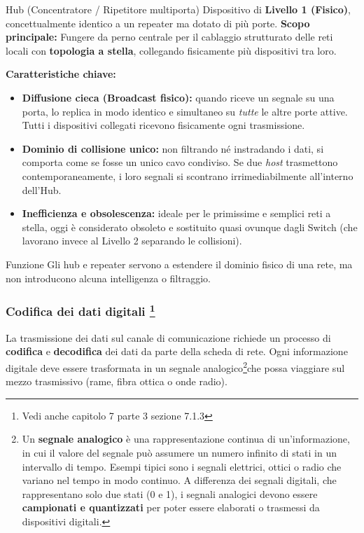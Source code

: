 \documentclass[a4paper,12pt]{report}
\begin{document}
\begin{defbox}{Hub (Concentratore / Ripetitore multiporta)}
Dispositivo di \textbf{Livello 1 (Fisico)}, concettualmente identico a un repeater ma dotato di più porte.  
\textbf{Scopo principale:} Fungere da perno centrale per il cablaggio strutturato delle reti locali con \textbf{topologia a stella}, collegando fisicamente più dispositivi tra loro.

\textbf{Caratteristiche chiave:}
\begin{itemize}
    \item \textbf{Diffusione cieca (Broadcast fisico):} quando riceve un segnale su una porta, lo replica in modo identico e simultaneo su \textit{tutte} le altre porte attive. Tutti i dispositivi collegati ricevono fisicamente ogni trasmissione.
    \item \textbf{Dominio di collisione unico:} non filtrando né instradando i dati, si comporta come se fosse un unico cavo condiviso. Se due \textit{host} trasmettono contemporaneamente, i loro segnali si scontrano irrimediabilmente all'interno dell'Hub.
    \item \textbf{Inefficienza e obsolescenza:} ideale per le primissime e semplici reti a stella, oggi è considerato obsoleto e sostituito quasi ovunque dagli Switch (che lavorano invece al Livello 2 separando le collisioni).
\end{itemize}
\end{defbox}

\begin{notebox}{Funzione}
Gli hub e repeater servono a estendere il dominio fisico di una rete, ma non introducono alcuna intelligenza o filtraggio.
\end{notebox}

\vspace{1cm}

\subsubsection*{Codifica dei dati digitali \footnote{Vedi anche capitolo 7 parte 3 sezione 7.1.3}}

La trasmissione dei dati sul canale di comunicazione richiede un processo di \textbf{codifica} e \textbf{decodifica} dei dati da parte della scheda di rete.  
Ogni informazione digitale deve essere trasformata in un segnale analogico\footnote{%
Un \textbf{segnale analogico} è una rappresentazione continua di un’informazione, 
in cui il valore del segnale può assumere un numero infinito di stati in un intervallo di tempo. 
Esempi tipici sono i segnali elettrici, ottici o radio che variano nel tempo in modo continuo. 
A differenza dei segnali digitali, che rappresentano solo due stati (0 e 1), 
i segnali analogici devono essere \textbf{campionati e quantizzati} per poter essere elaborati o trasmessi da dispositivi digitali.}che possa viaggiare sul mezzo trasmissivo (rame, fibra ottica o onde radio).
\end{document}
